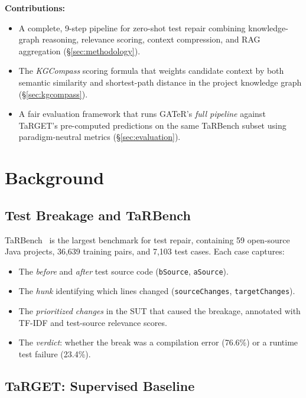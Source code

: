 \documentclass[conference,10pt]{IEEEtran}
\begin{document}
\textbf{Contributions:}
\begin{itemize}
    \item A complete, 9-step pipeline for zero-shot test repair combining
          knowledge-graph reasoning, relevance scoring, context compression,
          and RAG aggregation (\S\ref{sec:methodology}).
    \item The \emph{KGCompass} scoring formula that weights candidate context
          by both semantic similarity and shortest-path distance in the
          project knowledge graph (\S\ref{sec:kgcompass}).
    \item A fair evaluation framework that runs GATeR's \emph{full pipeline}
          against TaRGET's pre-computed predictions on the same TaRBench
          subset using paradigm-neutral metrics (\S\ref{sec:evaluation}).
\end{itemize}

\section{Background}
\label{sec:background}

\subsection{Test Breakage and TaRBench}

TaRBench~\cite{tarbench2023} is the largest benchmark for test repair,
containing 59 open-source Java projects, 36,639 training pairs, and
7,103 test cases. Each case captures:
\begin{itemize}
    \item The \emph{before} and \emph{after} test source code
          (\texttt{bSource}, \texttt{aSource}).
    \item The \emph{hunk} identifying which lines changed
          (\texttt{sourceChanges}, \texttt{targetChanges}).
    \item The \emph{prioritized changes} in the SUT that caused the
          breakage, annotated with TF-IDF and test-source relevance scores.
    \item The \emph{verdict}: whether the break was a compilation error
          (76.6\%) or a runtime test failure (23.4\%).
\end{itemize}

\subsection{TaRGET: Supervised Baseline}
\end{document}
